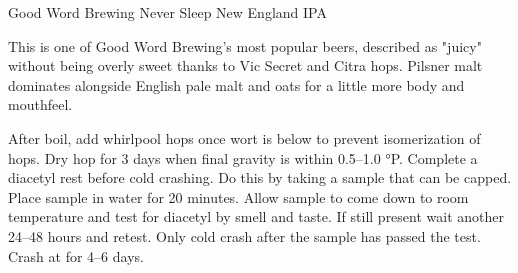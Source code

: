 \begin{recipie}{Good Word Brewing Never Sleep New England IPA}

\begin{aboutblock}
This is one of Good Word Brewing's most popular beers, described as "juicy" without being overly
sweet thanks to Vic Secret and Citra hops. Pilsner malt dominates alongside English pale malt and
oats for a little more body and mouthfeel.
\end{aboutblock}


\begin{methodandtiming}
 
\begin{mashsteps}
\end{mashsteps}

\begin{fermentationsteps}
\end{fermentationsteps}

\begin{directions}
After boil, add whirlpool hops once wort is below  to prevent isomerization of hops.
Dry hop for 3 days when final gravity is within 0.5--1.0 °P. Complete a diacetyl rest before
cold crashing. Do this by taking a  sample that can be capped. Place sample in
 water for 20 minutes. Allow sample to come down to room temperature and test for
diacetyl by smell and taste. If still present wait another 24--48 hours and retest.
Only cold crash after the sample has passed the test. Crash at  for 4--6 days.
\end{directions}

\end{methodandtiming}

\pagebreak

\begin{ingredientsblock}

\begin{malts}
\end{malts}

\begin{hops}
\end{hops}

\begin{yeasts}
\end{yeasts}

\end{ingredientsblock}

\end{recipie}

